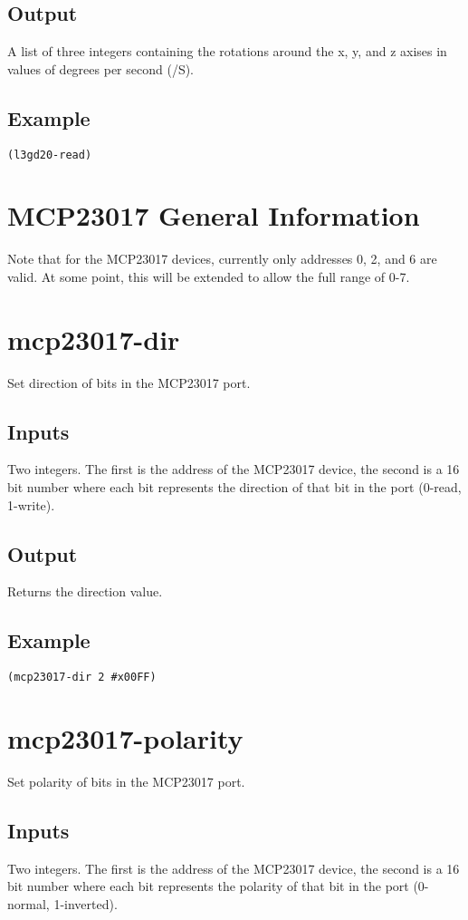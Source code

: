\documentclass[10pt, openany]{book}
\begin{document}
\subsection{Output}
A list of three integers containing the rotations around the x, y, and z axises in values of degrees per second (\degree/S).
\subsection{Example}
\begin{lstlisting}
(l3gd20-read)
\end{lstlisting}

\section{MCP23017 General Information}
Note that for the MCP23017 devices, currently only addresses 0, 2, and 6 are valid.  At some point, this will be extended to allow the full range of 0-7.

\section{mcp23017-dir}
Set direction of bits in the MCP23017 port.
\subsection{Inputs}
Two integers.  The first is the address of the MCP23017 device, the second is a 16 bit number where each bit represents the direction of that bit in the port (0-read, 1-write).
\subsection{Output}
Returns the direction value.
\subsection{Example}
\begin{lstlisting}
(mcp23017-dir 2 #x00FF)
\end{lstlisting}

\section{mcp23017-polarity}
Set polarity of bits in the MCP23017 port.
\subsection{Inputs}
Two integers.  The first is the address of the MCP23017 device, the second is a 16 bit number where each bit represents the polarity of that bit in the port (0-normal, 1-inverted).
\end{document}
